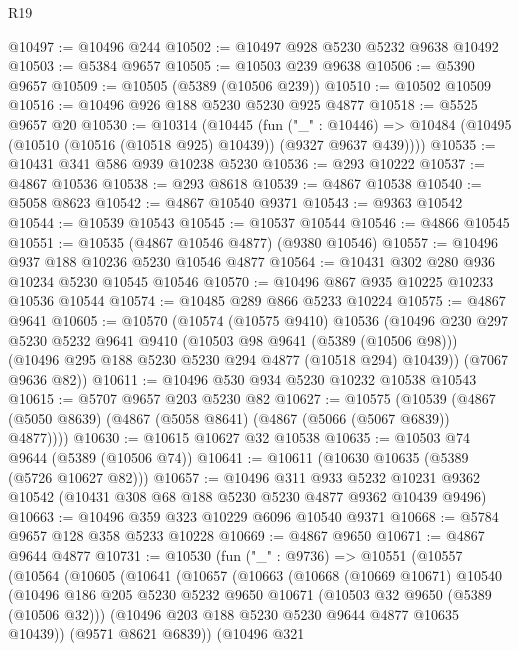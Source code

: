 \begin{lexlean}{R19}
\begin{coremodule}
@10497 := @10496 @244
@10502 := @10497 @928 @5230 @5232 @9638 @10492
@10503 := @5384 @9657
@10505 := @10503 @239 @9638
@10506 := @5390 @9657
@10509 := @10505 (@5389 (@10506 @239))
@10510 := @10502 @10509
@10516 := @10496 @926 @188 @5230 @5230 @925 @4877
@10518 := @5525 @9657 @20
@10530 := @10314
    (@10445
      (fun ("_" : @10446) =>
      @10484 (@10495 (@10510 (@10516 (@10518 @925) @10439)) (@9327 @9637 @439))))
@10535 := @10431 @341 @586 @939 @10238 @5230
@10536 := @293 @10222
@10537 := @4867 @10536
@10538 := @293 @8618
@10539 := @4867 @10538
@10540 := @5058 @8623
@10542 := @4867 @10540 @9371
@10543 := @9363 @10542
@10544 := @10539 @10543
@10545 := @10537 @10544
@10546 := @4866 @10545
@10551 := @10535 (@4867 @10546 @4877) (@9380 @10546)
@10557 := @10496 @937 @188 @10236 @5230 @10546 @4877
@10564 := @10431 @302 @280 @936 @10234 @5230 @10545 @10546
@10570 := @10496 @867 @935 @10225 @10233 @10536 @10544
@10574 := @10485 @289 @866 @5233 @10224
@10575 := @4867 @9641
@10605 := @10570
    (@10574
      (@10575 @9410)
      @10536
      (@10496
        @230
        @297
        @5230
        @5232
        @9641
        @9410
        (@10503 @98 @9641 (@5389 (@10506 @98)))
        (@10496 @295 @188 @5230 @5230 @294 @4877 (@10518 @294) @10439))
      (@7067 @9636 @82))
@10611 := @10496 @530 @934 @5230 @10232 @10538 @10543
@10615 := @5707 @9657 @203 @5230 @82
@10627 := @10575
    (@10539 (@4867 (@5050 @8639) (@4867 (@5058 @8641) (@4867 (@5066 (@5067 @6839)) @4877))))
@10630 := @10615 @10627 @32 @10538
@10635 := @10503 @74 @9644 (@5389 (@10506 @74))
@10641 := @10611 (@10630 @10635 (@5389 (@5726 @10627 @82)))
@10657 := @10496
    @311
    @933
    @5232
    @10231
    @9362
    @10542
    (@10431 @308 @68 @188 @5230 @5230 @4877 @9362 @10439 @9496)
@10663 := @10496 @359 @323 @10229 @6096 @10540 @9371
@10668 := @5784 @9657 @128 @358 @5233 @10228
@10669 := @4867 @9650
@10671 := @4867 @9644 @4877
@10731 := @10530
    (fun ("_" : @9736) =>
    @10551
      (@10557
        (@10564
          (@10605
            (@10641
              (@10657
                (@10663
                  (@10668
                    (@10669 @10671)
                    @10540
                    (@10496
                      @186
                      @205
                      @5230
                      @5232
                      @9650
                      @10671
                      (@10503 @32 @9650 (@5389 (@10506 @32)))
                      (@10496 @203 @188 @5230 @5230 @9644 @4877 @10635 @10439))
                    (@9571 @8621 @6839))
                  (@10496
                    @321

\end{coremodule}
\end{lexlean}
